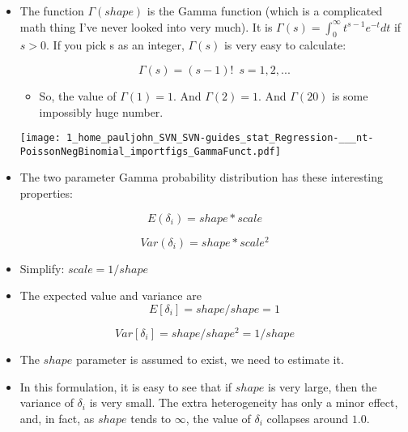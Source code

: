\documentclass[10pt,english]{beamer}
\def\lyxframeend{} %
\newenvironment{topcolumns}{\begin{columns}[t]}{\end{columns}}
\begin{document}
\lyxframeend{}
\begin{topcolumns}%

\end{topcolumns}%

\column{6cm}
\begin{itemize}
\item The function $\Gamma(shape)$ is the Gamma function (which is a complicated
math thing I've never looked into very much). It is $\Gamma(s)=\int_{0}^{\infty}t^{s-1}e^{-t}dt$
if $s>0$. If you pick s as an integer, $\Gamma(s)$ is very easy
to calculate:


\[
\Gamma(s)=(s-1)!\,\,\, s=1,2,...
\]

\begin{itemize}
\item So, the value of $\Gamma(1)=1.$ And $\Gamma(2)=1.$ And $\Gamma(20)$
is some impossibly huge number. 
\end{itemize}

\column{6cm}


\begin{center}
\texttt{[image: 1\_home\_pauljohn\_SVN\_SVN-guides\_stat\_Regression-\_\_\_nt-PoissonNegBinomial\_importfigs\_GammaFunct.pdf]}
\par\end{center}

\end{itemize}

\lyxframeend{}
\begin{itemize}
\item The two parameter Gamma probability distribution has these interesting
properties:
\end{itemize}
\[
E(\delta_{i})=shape*scale
\]


\[
Var(\delta_{i})=shape*scale^{2}
\]

\begin{itemize}
\item Simplify: $scale=1/shape$
\item The expected value and variance are 
\[
E[\delta_{i}]=shape/shape=1
\]

\end{itemize}
\[
Var[\delta_{i}]=shape/shape^{2}=1/shape
\]



\lyxframeend{}
\begin{itemize}
\item The $shape$ parameter is assumed to exist, we need to estimate it. 
\item In this formulation, it is easy to see that if $shape$ is very large,
then the variance of $\delta_{i}$ is very small. The extra heterogeneity
has only a minor effect, and, in fact, as $shape$ tends to $\infty$,
the value of $\delta_{i}$ collapses around $1.0$.
\end{itemize}
\end{document}

